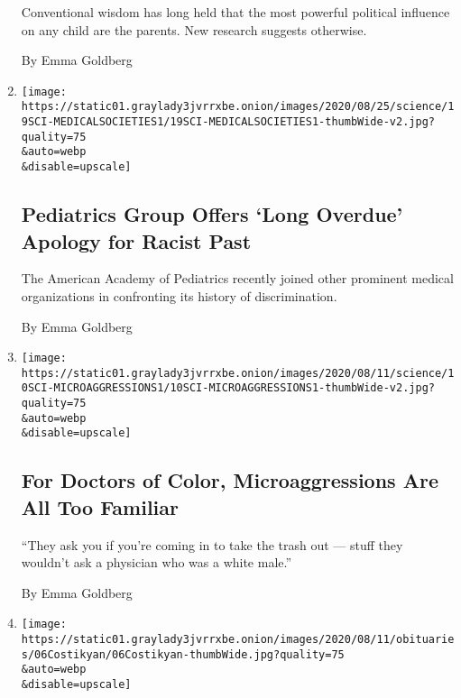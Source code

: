 \begin{enumerate}
  Conventional wisdom has long held that the most powerful political
  influence on any child are the parents. New research suggests
  otherwise.

  By Emma Goldberg
\item
  \href{/2020/08/20/health/pediatrics-medicine-racial-discrimination.html}{}

  \texttt{[image: https://static01.graylady3jvrrxbe.onion/images/2020/08/25/science/19SCI-MEDICALSOCIETIES1/19SCI-MEDICALSOCIETIES1-thumbWide-v2.jpg?quality=75\\\&auto=webp\\\&disable=upscale]}

  \hypertarget{pediatrics-group-offers-long-overdue-apology-for-racist-past}{%
  \subsection{Pediatrics Group Offers `Long Overdue' Apology for Racist
  Past}\label{pediatrics-group-offers-long-overdue-apology-for-racist-past}}

  The American Academy of Pediatrics recently joined other prominent
  medical organizations in confronting its history of discrimination.

  By Emma Goldberg
\item
  \href{/2020/08/11/health/microaggression-medicine-doctors.html}{}

  \texttt{[image: https://static01.graylady3jvrrxbe.onion/images/2020/08/11/science/10SCI-MICROAGGRESSIONS1/10SCI-MICROAGGRESSIONS1-thumbWide-v2.jpg?quality=75\\\&auto=webp\\\&disable=upscale]}

  \hypertarget{for-doctors-of-color-microaggressions-are-all-too-familiar}{%
  \subsection{For Doctors of Color, Microaggressions Are All Too
  Familiar}\label{for-doctors-of-color-microaggressions-are-all-too-familiar}}

  ``They ask you if you're coming in to take the trash out --- stuff
  they wouldn't ask a physician who was a white male.''

  By Emma Goldberg
\item
  \href{/2020/08/07/obituaries/barbara-costikyan-dead-coronavirus.html}{}

  \texttt{[image: https://static01.graylady3jvrrxbe.onion/images/2020/08/11/obituaries/06Costikyan/06Costikyan-thumbWide.jpg?quality=75\\\&auto=webp\\\&disable=upscale]}

  \hypertarget{those-weve-lost}{%
}
\end{enumerate}
